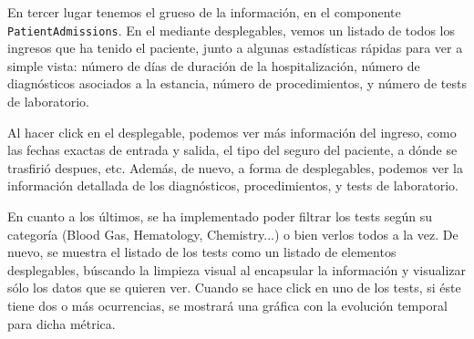 En tercer lugar tenemos el grueso de la información, en el componente \texttt{PatientAdmissions}. En el mediante desplegables, vemos un listado de todos los ingresos que ha tenido el paciente, junto a algunas estadísticas rápidas para ver a simple vista: número de días de duración de la hospitalización, número de diagnósticos asociados a la estancia, número de procedimientos, y número de tests de laboratorio. 

Al hacer click en el desplegable, podemos ver más información del ingreso, como las fechas exactas de entrada y salida, el tipo del seguro del paciente, a dónde se trasfirió despues, etc. Además, de nuevo, a forma de desplegables, podemos ver la información detallada de los diagnósticos, procedimientos, y tests de laboratorio.

En cuanto a los últimos, se ha implementado poder filtrar los tests según su categoría (Blood Gas, Hematology, Chemistry...) o bien verlos todos a la vez. De nuevo, se muestra el listado de los tests como un listado de elementos desplegables, búscando la limpieza visual al encapsular la información y visualizar sólo los datos que se quieren ver. Cuando se hace click en uno de los tests, si éste tiene dos o más ocurrencias, se mostrará una gráfica con la evolución temporal para dicha métrica. 


